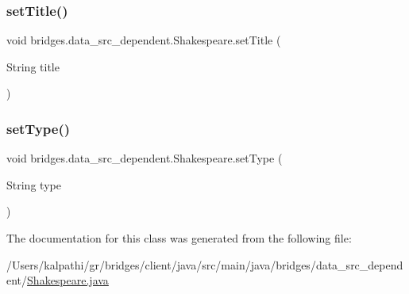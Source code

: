 \mbox{\label{classbridges_1_1data__src__dependent_1_1_shakespeare_a2687017aca35bb26b148f784a0bff732}} 
\subsubsection{\texorpdfstring{set\+Title()}{setTitle()}}
{\footnotesize\ttfamily void bridges.\+data\+\_\+src\+\_\+dependent.\+Shakespeare.\+set\+Title (\begin{DoxyParamCaption}\item[{String}]{title }\end{DoxyParamCaption})}

\mbox{\label{classbridges_1_1data__src__dependent_1_1_shakespeare_afcee18014d5630a0a15701635005bea2}} 
\subsubsection{\texorpdfstring{set\+Type()}{setType()}}
{\footnotesize\ttfamily void bridges.\+data\+\_\+src\+\_\+dependent.\+Shakespeare.\+set\+Type (\begin{DoxyParamCaption}\item[{String}]{type }\end{DoxyParamCaption})}



The documentation for this class was generated from the following file\+:\begin{DoxyCompactItemize}
\item 
/\+Users/kalpathi/gr/bridges/client/java/src/main/java/bridges/data\+\_\+src\+\_\+dependent/\mbox{\hyperlink{_shakespeare_8java}{Shakespeare.\+java}}\end{DoxyCompactItemize}
